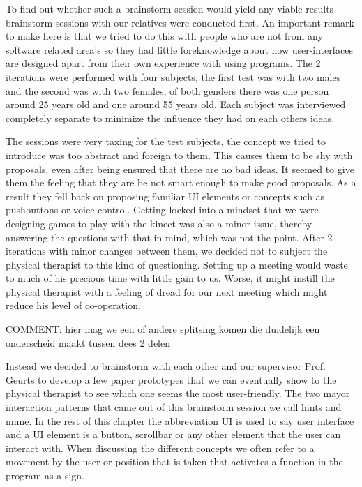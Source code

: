 To find out whether such a brainstorm session would yield any viable results brainstorm sessions with our relatives were conducted first. An important remark to make here is that we tried to do this with people who are not from any software related area's so they had little foreknowledge about how user-interfaces are designed apart from their own experience with using programs. The 2 iterations were performed with four subjects, the first test was with two males and the second was with two females, of both genders there was one person around 25 years old and one around 55 years old. Each subject was interviewed completely separate to minimize the influence they had on each others ideas.

The sessions were very taxing for the test subjects, the concept we tried to introduce was too abstract and foreign to them. This causes them to be shy with proposals, even after being ensured that there are no bad ideas. It seemed to give them the feeling that they are be not smart enough to make good proposals. As a result they fell back on proposing  familiar UI elements or concepts such as pushbuttons or voice-control. Getting locked into a mindset that we were designing games to play with the kinect was also a minor issue, thereby answering the questions with that in mind, which was not the point. After 2 iterations with minor changes between them, we decided not to subject the physical therapist to this kind of questioning. Setting up a meeting would waste to much of his precious time with little gain to us. Worse, it might instill the physical therapist with a feeling of dread for our next meeting which might reduce his level of co-operation. 

 {\large COMMENT: hier mag we een of andere splitsing komen die duidelijk een onderscheid maakt tussen dees 2 delen}

Instead we decided to brainstorm with each other and our supervisor Prof. Geurts to develop a few paper prototypes that we can eventually show to the physical therapist to see which one seems the most user-friendly. The two mayor interaction patterns that came out of this brainstorm session we call hints and mime. In the rest of this chapter the abbreviation UI is used to say user interface and a UI element is a button, scrollbar or any other element that the user can interact with. When discussing the different concepts we often refer to a movement by the user or position that is taken that activates a function in the program as a sign.

